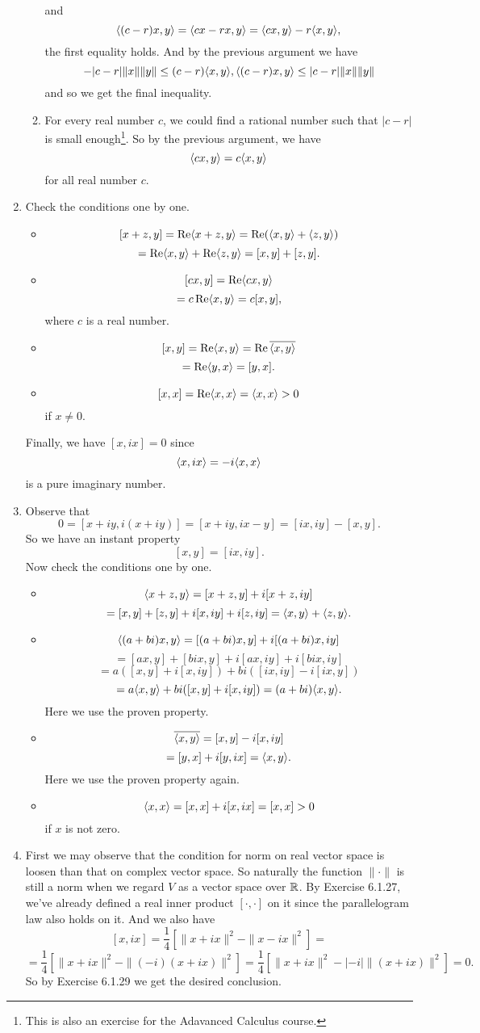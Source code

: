 \begin{enumerate}
\begin{enumerate}
and 
\[\langle (c-r)x,y\rangle =\langle cx-rx,y\rangle =\langle cx,y\rangle -r\langle x,y\rangle ,\]
the first equality holds. And by the previous argument we have 
\[-|c-r|\|x\|\|y\|\leq (c-r)\langle x,y\rangle ,\langle (c-r)x,y\rangle \leq |c-r|\|x\|\|y\|\]
and so we get the final inequality.
\item For every real number $c$, we could find a rational number such that $|c-r|$ is small enough\footnote{This is also an exercise for the Adavanced Calculus course.}. So by the previous argument, we have 
\[\langle cx,y\rangle =c\langle x,y\rangle \]
for all real number $c$.
\end{enumerate}
\item Check the conditions one by one. \begin{itemize}
\item \[[x+z,y]=\operatorname{Re}\langle x+z,y\rangle =\operatorname{Re}(\langle x,y\rangle +\langle z,y\rangle)\]
\[=\operatorname{Re}\langle x,y\rangle +\operatorname{Re}\langle z,y\rangle =[x,y]+[z,y].\]
\item \[[cx,y]=\operatorname{Re}\langle cx,y\rangle \]
\[=c\operatorname{Re}\langle x,y\rangle =c[x,y],\]
where $c$ is a real number.
\item \[[x,y]=\operatorname{Re}\langle x,y\rangle =\operatorname{Re}\overline{\langle x,y\rangle }\]
\[=\operatorname{Re}\langle y,x\rangle =[y,x].\]
\item \[[x,x]=\operatorname{Re}\langle x,x\rangle =\langle x,x\rangle >0\]
if $x\neq 0$.
\end{itemize}
Finally, we have $[x,ix]=0$ since 
\[\langle x,ix\rangle =-i\langle x,x\rangle \]
is a pure imaginary number.
\item Observe that 
\[0=[x+iy,i(x+iy)]=[x+iy,ix-y]=[ix,iy]-[x,y].\]
So we have an instant property 
\[[x,y]=[ix,iy].\]
Now check the conditions one by one. \begin{itemize}
\item \[\langle x+z,y\rangle =[x+z,y]+i[x+z,iy]\]
\[=[x,y]+[z,y]+i[x,iy]+i[z,iy]=\langle x,y\rangle +\langle z,y\rangle .\]
\item \[\langle (a+bi)x,y\rangle =[(a+bi)x,y]+i[(a+bi)x,iy]\]
\[=[ax,y]+[bix,y]+i[ax,iy]+i[bix,iy]\]
\[=a([x,y]+i[x,iy])+bi([ix,iy]-i[ix,y])\]
\[=a\langle x,y\rangle +bi([x,y]+i[x,iy])=(a+bi)\langle x,y\rangle .\]
Here we use the proven property.
\item \[\overline{\langle x,y\rangle}=[x,y]-i[x,iy]\]
\[=[y,x]+i[y,ix]=\langle x,y\rangle .\]
Here we use the proven property again.
\item \[\langle x,x\rangle =[x,x]+i[x,ix]=[x,x]>0\]
if $x$ is not zero.
\end{itemize}
\item First we may observe that the condition for norm on real vector space is loosen than that on complex vector space. So naturally the function $\|\cdot \|$ is still a norm when we regard $V$ as a vector space over $\mathbb{R}$. By Exercise 6.1.27, we've already defined a real inner product $[\cdot ,\cdot ]$ on it since the parallelogram law also holds on it. And we also have 
\[[x,ix]=\frac{1}{4}[\|x+ix\|^2-\|x-ix\|^2]=\]
\[=\frac{1}{4}[\|x+ix\|^2-\|(-i)(x+ix)\|^2]=\frac{1}{4}[\|x+ix\|^2-|-i|\|(x+ix)\|^2]=0.\]
So by Exercise 6.1.29 we get the desired conclusion.
\end{enumerate}
